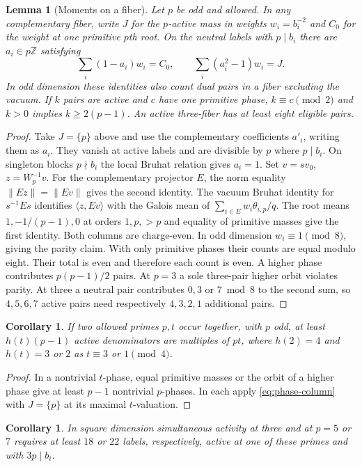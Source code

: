 \documentclass[11pt]{amsart}
\numberwithin{equation}{section}
\newtheorem{lemma}[theorem]{Lemma}
\newtheorem{corollary}[theorem]{Corollary}
\theoremstyle{definition}
\theoremstyle{plain}
\newcommand{\ZZ}{\mathbb Z}
\begin{document}
\begin{lemma}[Moments on a fiber]\label{phase:moments}
Let $p$ be odd and allowed. In any complementary fiber, write $J$
for the $p$-active mass in weights $w_i=b_i^{-2}$ and $C_0$ for
the weight at one primitive $p$th root. On the neutral labels with
$p\mid b_i$ there are $a_i\in p\ZZ$ satisfying
\[
 \sum_i(1-a_i)w_i=C_0,\qquad\sum_i(a_i^2-1)w_i=J.
\]
In odd dimension these identities also count dual pairs in a fiber
excluding the vacuum. If $k$ pairs are active and $c$ have one
primitive phase, $k\equiv c\pmod2$ and $k>0$ implies
$k\ge2(p-1)$. An active three-fiber has at least eight eligible pairs.
\end{lemma}
\begin{proof}
Take $J=\{p\}$ above and use the complementary coefficients $a'_i$,
writing them as $a_i$. They vanish at active labels and are divisible
by $p$ where $p\mid b_i$. On singleton blocks $p\nmid b_i$ the
local Bruhat relation gives $a_i=1$. Set $v=sv_0$, $z=W_p^{-1}v$.
For the complementary projector $E$, the norm equality
$\|Ez\|=\|Ev\|$ gives the second identity. The vacuum Bruhat
identity for $s^{-1}Es$ identifies $\langle z,Ev\rangle$
with the Galois mean of $\sum_{i\in E}w_i\theta_{i,p}/q$.
The root means $1,-1/(p-1),0$ at orders $1,p,>p$ and equality
of primitive masses give the first identity. Both columns are
charge-even. In odd dimension $w_i\equiv1\pmod8$, giving the parity
claim. With only primitive phases their counts are equal modulo eight.
Their total is even and therefore each count is even. A higher
phase contributes $p(p-1)/2$ pairs. At $p=3$ a sole three-pair
higher orbit violates parity. At three a neutral pair contributes
$0,3$ or $7\bmod8$ to the second sum, so $4,5,6,7$ active pairs
need respectively $4,3,2,1$ additional pairs.
\end{proof}
\begin{corollary}\label{result:mixed}
If two allowed primes $p,t$ occur together, with $p$ odd, at least
$h(t)(p-1)$ active denominators are multiples of $pt$, where $h(2)=4$
and $h(t)=3$ or $2$ as $t\equiv3$ or $1\pmod4$. 
\end{corollary}
\begin{proof}
In a nontrivial $t$-phase, equal primitive masses or the orbit of a
higher phase give at least $p-1$ nontrivial $p$-phases. In each
apply \eqref{eq:phase-column} with $J=\{p\}$ at its maximal
$t$-valuation.
\end{proof}
\begin{corollary}\label{result:fiber-squares}
In square dimension simultaneous activity at three and at $p=5$ or
$7$ requires at least $18$ or $22$ labels, respectively, active at
one of these primes and with $3p\mid b_i$.
\end{corollary}
\end{document}
